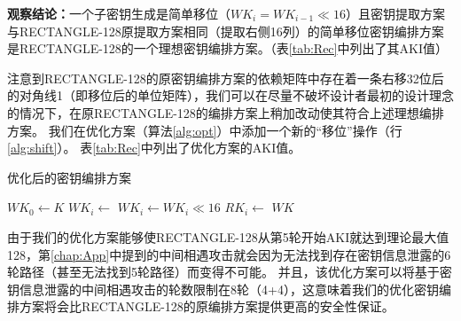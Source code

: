 \noindent
\textbf{观察结论：}一个子密钥生成是简单移位（$WK_i=WK_{i-1}\ll 16$）且密钥提取方案与RECTANGLE-128原提取方案相同（提取右侧16列）的简单移位密钥编排方案是RECTANGLE-128的一个理想密钥编排方案。（表\ref{tab:Rec}中列出了其AKI值）

注意到RECTANGLE-128的原密钥编排方案的依赖矩阵中存在着一条右移32位后的对角线1（即移位后的单位矩阵），我们可以在尽量不破坏设计者最初的设计理念的情况下，在原RECTANGLE-128的编排方案上稍加改动使其符合上述理想编排方案。
我们在优化方案（算法\ref{alg:opt}）中添加一个新的“移位”操作（行\ref{alg:shift}）。
表\ref{tab:Rec}中列出了优化方案的AKI值。
\begin{algorithm}
    \caption{优化后的密钥编排方案}
    \begin{algorithmic}[1]
        \State $WK_0 \gets K$
        \State $WK_i \gets$ 
        \State \textbf{$WK_i \gets WK_i \ll 16$} \label{alg:shift} 
        \State $RK_i \gets$ 
        \EndFor
        \State \Return $WK$
        \EndFunction
    \end{algorithmic}
    \label{alg:opt}
\end{algorithm}

由于我们的优化方案能够使RECTANGLE-128从第5轮开始AKI就达到理论最大值128，第\ref{chap:App}中提到的中间相遇攻击就会因为无法找到存在密钥信息泄露的6轮路径（甚至无法找到5轮路径）而变得不可能。
并且，该优化方案可以将基于密钥信息泄露的中间相遇攻击的轮数限制在8轮（4+4），这意味着我们的优化密钥编排方案将会比RECTANGLE-128的原编排方案提供更高的安全性保证。
